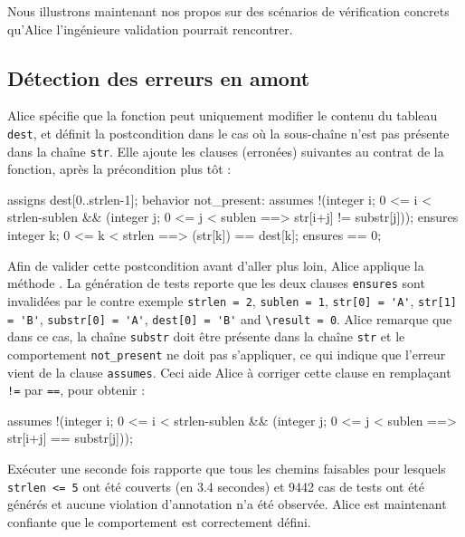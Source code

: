 Nous illustrons maintenant nos propos sur des scénarios de vérification
concrets qu'Alice l'ingénieure validation pourrait rencontrer.


\subsection{Détection des erreurs en amont}
\label{sec:ncd-early}


Alice spécifie que la fonction peut uniquement modifier le contenu du tableau
\lstinline{dest}, et définit la postcondition dans le cas où la sous-chaîne
n'est pas présente dans la chaîne \lstinline'str'.
Elle ajoute les clauses (erronées) suivantes au contrat de la fonction, après
la précondition plus tôt :

\begin{pretty-codeACSL}
assigns dest[0..strlen-1];
behavior not_present:
 assumes !(\exists integer i; 0 <= i < strlen-sublen && 
  (\forall integer j; 0 <= j < sublen ==> str[i+j] != substr[j]));
 ensures \forall integer k; 0 <= k < strlen ==> \old(str[k]) == dest[k];
 ensures \result == 0;
\end{pretty-codeACSL}

Afin de valider cette postcondition avant d'aller plus loin, Alice applique
la méthode \NCD.
La génération de tests reporte que les deux clauses \lstinline{ensures} sont
invalidées par le contre exemple
\lstinline{strlen = 2}, \lstinline{sublen = 1}, \lstinline{str[0] = 'A'},
\lstinline{str[1] = 'B'}, \lstinline{substr[0] = 'A'}, 
\lstinline{dest[0] = 'B'} and \lstinline{\result = 0}.
Alice remarque que dans ce cas, la chaîne \lstinline{substr} doit être présente
dans la chaîne \lstinline{str} et le comportement \lstinline{not_present} ne
doit pas s'appliquer, ce qui indique que l'erreur vient de la clause
\lstinline{assumes}.
Ceci aide Alice à corriger cette clause en remplaçant \lstinline{!=} par
\lstinline{==}, pour obtenir :

\begin{pretty-codeACSL}
  assumes !(\exists integer i; 0 <= i < strlen-sublen && 
   (\forall integer j; 0 <= j < sublen ==> str[i+j] == substr[j]));
\end{pretty-codeACSL}

Exécuter \NCD une seconde fois rapporte que tous les chemins faisables pour
lesquels \lstinline{strlen <= 5} ont été couverts (en 3.4 secondes) et 9442 cas
de tests ont été générés et aucune violation d'annotation n'a été observée.
Alice est maintenant confiante que le comportement est correctement défini.

